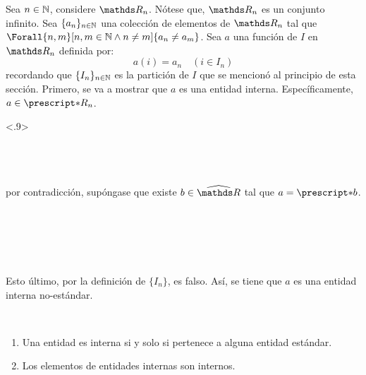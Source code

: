 \begin{demo}
  Sea $n\in\mathbb{N}$, considere $\R_n$. Nótese que, $\R_n$ es un conjunto
  infinito. Sea $\{a_n\}_{n\in\mathbb{N}}$ una colección de elementos de $\R_n$
  tal que $\Forall{n,m}[n,m\in\N \land n\not= m]{a_n \not= a_m}$.
  Sea $a$ una función de $I$ en $\R_n$ definida por:
  \[a(i) = a_n \quad (i\in I_n)\]
  recordando que $\{I_n\}_{n\in\mathbb{N}}$ es la partición de $I$ que se
  mencionó al principio de esta sección. Primero, se va a mostrar que
  $a$ es una entidad interna. Específicamente, $a\in\st{R_n}$.
  \begin{longderivation}<.9>
      \\
    \equiv\\
      \\
    \equiv\\
  \end{longderivation}

  por contradicción, supóngase que existe $b\in\Rh$ tal que $a=\st{b}$.
  \begin{longderivation}
      \\
    \equiv\\
      \\
    \\
  \end{longderivation}
  Esto último, por la definición de $\{I_n\}$, es falso. Así, se tiene
  que $a$ es una entidad interna no-estándar.
\end{demo}

\begin{theorem}~
  \begin{enumerate}
    \item Una entidad es interna si y solo si pertenece a alguna
          entidad estándar.
    \item Los elementos de entidades internas son internos.
  \end{enumerate}
\end{theorem}

